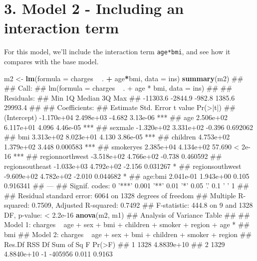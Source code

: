 \documentclass[]{article}
\newenvironment{Shaded}{\begin{snugshade}}{\end{snugshade}}
\newcommand{\KeywordTok}[1]{\textcolor[rgb]{0.13,0.29,0.53}{\textbf{#1}}}
\newcommand{\DataTypeTok}[1]{\textcolor[rgb]{0.13,0.29,0.53}{#1}}
\newcommand{\StringTok}[1]{\textcolor[rgb]{0.31,0.60,0.02}{#1}}
\newcommand{\OperatorTok}[1]{\textcolor[rgb]{0.81,0.36,0.00}{\textbf{#1}}}
\newcommand{\NormalTok}[1]{#1}
\begin{document}
\section{3. Model 2 - Including an interaction
term}\label{model-2---including-an-interaction-term}

For this model, we'll include the interaction term \texttt{age*bmi}, and
see how it compares with the base model.

\begin{Shaded}
\begin{Highlighting}[]
\NormalTok{m2 <-}\StringTok{ }\KeywordTok{lm}\NormalTok{(}\DataTypeTok{formula =}\NormalTok{ charges }\OperatorTok{~}\StringTok{ }\NormalTok{. }\OperatorTok{+}\StringTok{ }\NormalTok{age}\OperatorTok{*}\NormalTok{bmi,}
         \DataTypeTok{data =}\NormalTok{ ins)}
\KeywordTok{summary}\NormalTok{(m2)}
\NormalTok{## }
\NormalTok{## Call:}
\NormalTok{## lm(formula = charges ~ . + age * bmi, data = ins)}
\NormalTok{## }
\NormalTok{## Residuals:}
\NormalTok{##      Min       1Q   Median       3Q      Max }
\NormalTok{## -11303.6  -2844.9   -982.8   1385.6  29993.4 }
\NormalTok{## }
\NormalTok{## Coefficients:}
\NormalTok{##                   Estimate Std. Error t value Pr(>|t|)    }
\NormalTok{## (Intercept)     -1.170e+04  2.498e+03  -4.682 3.13e-06 ***}
\NormalTok{## age              2.506e+02  6.117e+01   4.096 4.46e-05 ***}
\NormalTok{## sexmale         -1.320e+02  3.331e+02  -0.396 0.692062    }
\NormalTok{## bmi              3.313e+02  8.023e+01   4.130 3.86e-05 ***}
\NormalTok{## children         4.753e+02  1.379e+02   3.448 0.000583 ***}
\NormalTok{## smokeryes        2.385e+04  4.134e+02  57.690  < 2e-16 ***}
\NormalTok{## regionnorthwest -3.518e+02  4.766e+02  -0.738 0.460592    }
\NormalTok{## regionsoutheast -1.033e+03  4.792e+02  -2.156 0.031267 *  }
\NormalTok{## regionsouthwest -9.609e+02  4.782e+02  -2.010 0.044682 *  }
\NormalTok{## age:bmi          2.041e-01  1.943e+00   0.105 0.916341    }
\NormalTok{## ---}
\NormalTok{## Signif. codes:  0 '***' 0.001 '**' 0.01 '*' 0.05 '.' 0.1 ' ' 1}
\NormalTok{## }
\NormalTok{## Residual standard error: 6064 on 1328 degrees of freedom}
\NormalTok{## Multiple R-squared:  0.7509, Adjusted R-squared:  0.7492 }
\NormalTok{## F-statistic: 444.8 on 9 and 1328 DF,  p-value: < 2.2e-16}
\KeywordTok{anova}\NormalTok{(m2, m1)}
\NormalTok{## Analysis of Variance Table}
\NormalTok{## }
\NormalTok{## Model 1: charges ~ age + sex + bmi + children + smoker + region + age * }
\NormalTok{##     bmi}
\NormalTok{## Model 2: charges ~ age + sex + bmi + children + smoker + region}
\NormalTok{##   Res.Df        RSS Df Sum of Sq     F Pr(>F)}
\NormalTok{## 1   1328 4.8839e+10                          }
\NormalTok{## 2   1329 4.8840e+10 -1   -405956 0.011 0.9163}
\end{Highlighting}
\end{Shaded}
\end{document}
